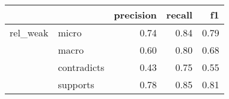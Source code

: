 \begin{tabular}{llrrr}
\toprule
         &          &  precision &  recall &   f1 \\
\midrule
rel\_weak & micro &       0.74 &    0.84 & 0.79 \\
         & macro &       0.60 &    0.80 & 0.68 \\
         & contradicts &       0.43 &    0.75 & 0.55 \\
         & supports &       0.78 &    0.85 & 0.81 \\
\bottomrule
\end{tabular}
